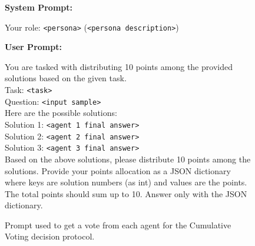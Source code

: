 \begin{figure}[H]
    \centering
    \begin{combinedprompt}
    \textbf{System Prompt:} \\
    \begingroup
    \colorbox{systemcolor}{\parbox{\dimexpr\linewidth-2\fboxsep\relax}{
    Your role: \texttt{<persona>} (\texttt{<persona description>})
    }}
    \endgroup

    \vspace{0.4em} %

    \textbf{User Prompt:} \\
    \begingroup
    \colorbox{usercolor}{\parbox{\dimexpr\linewidth-2\fboxsep\relax}{
    You are tasked with distributing 10 points among the provided solutions based on the given task.\\
    Task: \texttt{<task>}\\
    Question: \texttt{<input sample>}\\
    Here are the possible solutions:\\
    Solution 1: \texttt{<agent 1 final answer>}\\
    Solution 2: \texttt{<agent 2 final answer>}\\
    Solution 3: \texttt{<agent 3 final answer>}\\
    Based on the above solutions, please distribute 10 points among the solutions. Provide your points allocation as a JSON dictionary where keys are solution numbers (as int) and values are the points. The total points should sum up to 10. Answer only with the JSON dictionary.
    }}
    \endgroup
\end{combinedprompt}
    \caption{Prompt used to get a vote from each agent for the Cumulative Voting decision protocol.}
    \label{fig:cumulative_voting_prompt}
\end{figure}

